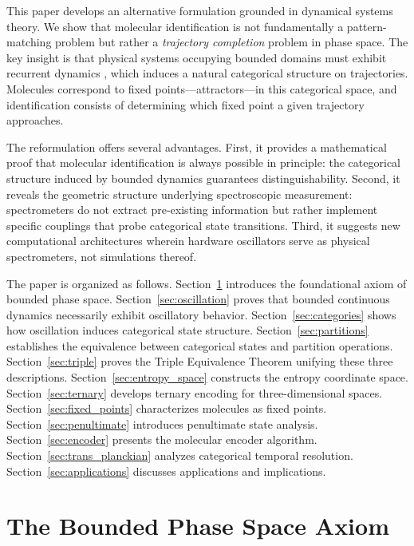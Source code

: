 \documentclass[twocolumn,10pt,a4paper]{article}
\begin{document}
This paper develops an alternative formulation grounded in dynamical systems theory. We show that molecular identification is not fundamentally a pattern-matching problem but rather a \emph{trajectory completion} problem in phase space. The key insight is that physical systems occupying bounded domains must exhibit recurrent dynamics \citep{poincare1890probleme}, which induces a natural categorical structure on trajectories. Molecules correspond to fixed points---attractors---in this categorical space, and identification consists of determining which fixed point a given trajectory approaches.

The reformulation offers several advantages. First, it provides a mathematical proof that molecular identification is always possible in principle: the categorical structure induced by bounded dynamics guarantees distinguishability. Second, it reveals the geometric structure underlying spectroscopic measurement: spectrometers do not extract pre-existing information but rather implement specific couplings that probe categorical state transitions. Third, it suggests new computational architectures wherein hardware oscillators serve as physical spectrometers, not simulations thereof.

The paper is organized as follows. Section~\ref{sec:axiom} introduces the foundational axiom of bounded phase space. Section~\ref{sec:oscillation} proves that bounded continuous dynamics necessarily exhibit oscillatory behavior. Section~\ref{sec:categories} shows how oscillation induces categorical state structure. Section~\ref{sec:partitions} establishes the equivalence between categorical states and partition operations. Section~\ref{sec:triple} proves the Triple Equivalence Theorem unifying these three descriptions. Section~\ref{sec:entropy_space} constructs the entropy coordinate space. Section~\ref{sec:ternary} develops ternary encoding for three-dimensional spaces. Section~\ref{sec:fixed_points} characterizes molecules as fixed points. Section~\ref{sec:penultimate} introduces penultimate state analysis. Section~\ref{sec:encoder} presents the molecular encoder algorithm. Section~\ref{sec:trans_planckian} analyzes categorical temporal resolution. Section~\ref{sec:applications} discusses applications and implications.

\section{The Bounded Phase Space Axiom}
\label{sec:axiom}
\end{document}
